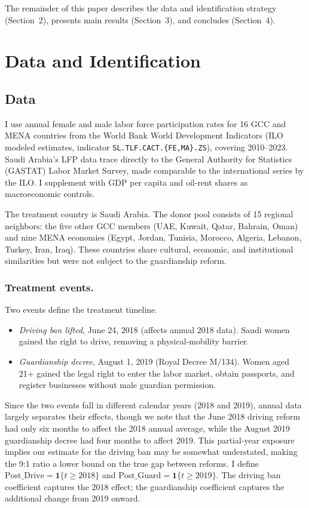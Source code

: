 \documentclass[12pt]{article}
\begin{document}
The remainder of this paper describes the data and identification strategy (Section~2), presents main results (Section~3), and concludes (Section~4).

\section{Data and Identification}

\subsection{Data}

I use annual female and male labor force participation rates for 16 GCC and MENA countries from the World Bank World Development Indicators (ILO modeled estimates, indicator \texttt{SL.TLF.CACT.\{FE,MA\}.ZS}), covering 2010--2023. Saudi Arabia's LFP data trace directly to the General Authority for Statistics (GASTAT) Labor Market Survey, made comparable to the international series by the ILO. I supplement with GDP per capita and oil-rent shares as macroeconomic controls.

The treatment country is Saudi Arabia. The donor pool consists of 15 regional neighbors: the five other GCC members (UAE, Kuwait, Qatar, Bahrain, Oman) and nine MENA economies (Egypt, Jordan, Tunisia, Morocco, Algeria, Lebanon, Turkey, Iran, Iraq). These countries share cultural, economic, and institutional similarities but were not subject to the guardianship reform.

\subsubsection*{Treatment events.} Two events define the treatment timeline.
\begin{itemize}
  \item \textit{Driving ban lifted}, June 24, 2018 (affects annual 2018 data). Saudi women gained the right to drive, removing a physical-mobility barrier.
  \item \textit{Guardianship decree}, August 1, 2019 (Royal Decree M/134). Women aged 21+ gained the legal right to enter the labor market, obtain passports, and register businesses without male guardian permission.
\end{itemize}

Since the two events fall in different calendar years (2018 and 2019), annual data largely separates their effects, though we note that the June 2018 driving reform had only six months to affect the 2018 annual average, while the August 2019 guardianship decree had four months to affect 2019. This partial-year exposure implies our estimate for the driving ban may be somewhat understated, making the 9:1 ratio a lower bound on the true gap between reforms. I define $\text{Post\_Drive} = \mathbf{1}\{t \ge 2018\}$ and $\text{Post\_Guard} = \mathbf{1}\{t \ge 2019\}$. The driving ban coefficient captures the 2018 effect; the guardianship coefficient captures the additional change from 2019 onward.
\end{document}
